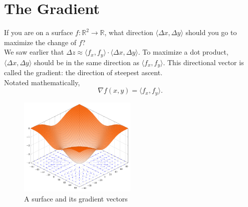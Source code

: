 \section{The Gradient}
\noindent
If you are on a surface $f: \mathbb{R}^2 \to \mathbb{R}$, what direction $\langle \Delta x, \Delta y \rangle$ should you go to maximize the change of $f$?\\
We saw earlier that $\Delta z\approx \langle f_x, f_y \rangle \cdot \langle \Delta x, \Delta y \rangle$.
To maximize a dot product, $\langle \Delta x, \Delta y \rangle$ should be in the same direction as $\langle f_x, f_y \rangle$.
This directional vector is called the gradient: the direction of steepest ascent.\\
Notated mathematically,
\begin{equation*}
	\nabla f(x,y) = \langle f_x, f_y \rangle.
\end{equation*}

\begin{figure}[H]
	\centering
	\includegraphics[width=0.5\textwidth]{./differentialMultivariableCalculus/gradient.png}
	\caption{A surface and its gradient vectors}
\end{figure}



